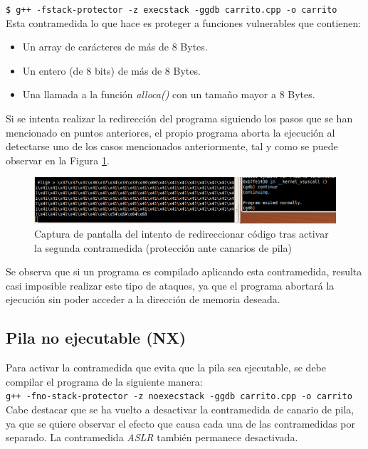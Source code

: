 \documentclass[10pt,a4paper]{article}
\begin{document}
\texttt{\$ g++ -fstack-protector -z execstack -ggdb carrito.cpp -o carrito}\\

Esta contramedida lo que hace es proteger a funciones vulnerables que contienen:  
\begin{itemize}
	\item Un array de carácteres de más de 8 Bytes.
	\item Un entero (de 8 bits) de más de 8 Bytes.
	\item Una llamada a la función \textit{alloca()} con un tamaño mayor a 8 Bytes.
\end{itemize}

Si se intenta realizar la redirección del programa siguiendo los pasos que se han mencionado en puntos anteriores, el propio programa aborta la ejecución al detectarse uno de los casos mencionados anteriormente, tal y como se puede observar en la Figura \ref{fig:contramedida2}.

\begin{figure}[h!]
	\centering
	\includegraphics[scale=0.6]{images/contramedida_2.png}
	\caption{Captura de pantalla del intento de redireccionar código tras activar la segunda contramedida (protección ante canarios de pila)}
	\label{fig:contramedida2}
\end{figure}

Se observa que si un programa es compilado aplicando esta contramedida, resulta casi imposible realizar este tipo de ataques, ya que el programa abortará la ejecución sin poder acceder a la dirección de memoria deseada.\\


\newpage
\subsection{Pila no ejecutable (NX)}
Para activar la contramedida que evita que la pila sea ejecutable, se debe compilar el programa de la siguiente manera: \\

\texttt{g++ -fno-stack-protector -z noexecstack -ggdb carrito.cpp -o carrito}\\

Cabe destacar que se ha vuelto a desactivar la contramedida de canario de pila, ya que se quiere observar el efecto que causa cada una de las contramedidas por separado. La contramedida \textit{ASLR} también permanece desactivada.\\
\end{document}
